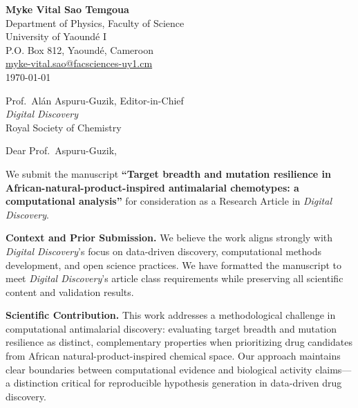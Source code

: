 \documentclass[11pt,letterpaper]{article}
\begin{document}
\begin{flushleft}
\textbf{Myke Vital Sao Temgoua} \\
Department of Physics, Faculty of Science \\
University of Yaound\'{e} I \\
P.O. Box 812, Yaound\'{e}, Cameroon \\
\href{mailto:myke-vital.sao@facsciences-uy1.cm}{myke-vital.sao@facsciences-uy1.cm} \\[1em]
\today
\end{flushleft}

\begin{flushleft}
Prof.\ Al\'{a}n Aspuru-Guzik, Editor-in-Chief \\
\textit{Digital Discovery} \\
Royal Society of Chemistry
\end{flushleft}

\vspace{0.5em}

\noindent Dear Prof.\ Aspuru-Guzik,

We submit the manuscript \textbf{``Target breadth and mutation resilience in African-natural-product-inspired antimalarial chemotypes: a computational analysis''} for consideration as a Research Article in \textit{Digital Discovery}.

\vspace{0.3em}

\noindent\textbf{Context and Prior Submission.}
We believe the work aligns strongly with \textit{Digital Discovery}'s focus on data-driven discovery, computational methods development, and open science practices. We have formatted the manuscript to meet \textit{Digital Discovery}'s article class requirements while preserving all scientific content and validation results.

\vspace{0.3em}

\noindent\textbf{Scientific Contribution.}
This work addresses a methodological challenge in computational antimalarial discovery: evaluating target breadth and mutation resilience as distinct, complementary properties when prioritizing drug candidates from African natural-product-inspired chemical space. Our approach maintains clear boundaries between computational evidence and biological activity claims---a distinction critical for reproducible hypothesis generation in data-driven drug discovery.
\end{document}
